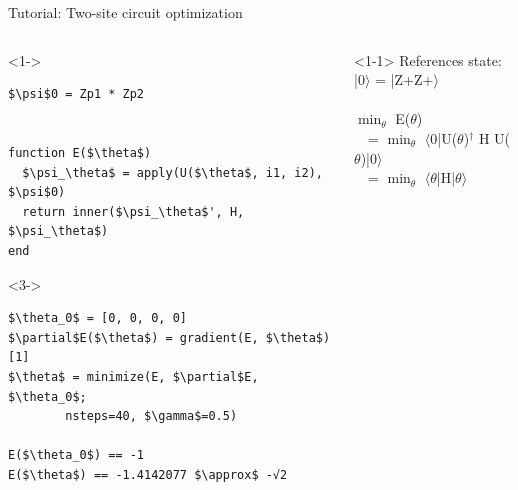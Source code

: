 \begin{frame}[fragile]{Tutorial: Two-site circuit optimization}

\begin{columns}

\begin{column}{5cm}

\begin{onlyenv}<1->
\begin{lstlisting}[language=JuliaLocal, style=julia, mathescape, basicstyle=\scriptsize\ttfamily]
$\psi$0 = Zp1 * Zp2


function E($\theta$)
  $\psi_\theta$ = apply(U($\theta$, i1, i2), $\psi$0)
  return inner($\psi_\theta$', H, $\psi_\theta$)
end
\end{lstlisting}
\end{onlyenv}

\begin{onlyenv}<3->
\begin{lstlisting}[language=JuliaLocal, style=julia, mathescape, basicstyle=\scriptsize\ttfamily]
$\theta_0$ = [0, 0, 0, 0]
$\partial$E($\theta$) = gradient(E, $\theta$)[1]
$\theta$ = minimize(E, $\partial$E, $\theta_0$;
        nsteps=40, $\gamma$=0.5)

E($\theta_0$) == -1
E($\theta$) == -1.4142077 $\approx$ -√2
\end{lstlisting}
\end{onlyenv}

\end{column}

\begin{column}{5cm}

\begin{onlyenv}<1-1>
References state: \\
|0$\rangle$ = |Z+Z+$\rangle$ \\
~\\
$\min_{\theta}$ E($\theta$)\\
\ \ = $\min_{\theta}$ $\langle$0|U($\theta$)$^\dagger$ H U($\theta$)|0$\rangle$ \\
\ \ = $\min_{\theta}$ $\langle\theta$|H|$\theta\rangle$ \\
\end{onlyenv}


\end{column}
\end{columns}
\end{frame}
